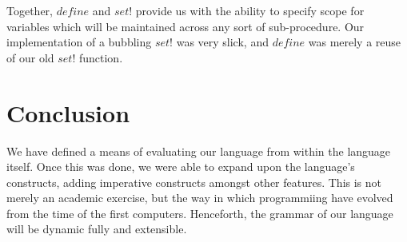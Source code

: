 Together, $define$ and $set!$ provide us with the ability to specify scope
for variables which will be maintained across any sort of sub-procedure. Our
implementation of a bubbling $set!$ was very slick, and $define$ was merely
a reuse of our old $set!$ function.

\section{Conclusion}
We have defined a means of evaluating our language from within the language
itself. Once this was done, we were able to expand upon the language's constructs,
adding imperative constructs amongst other features. This is not merely an
academic exercise, but the way in which programmiing have evolved from the time
of the first computers. Henceforth, the grammar of our language will be dynamic
fully and extensible.
